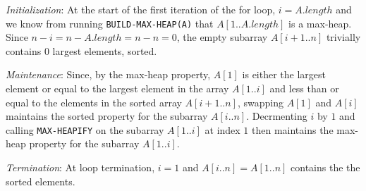 \textit{Initialization}: At the start of the first iteration of the for loop, $i = A.length$ and we know from running \texttt{BUILD-MAX-HEAP(A)} that $A[1..A.length]$ is a max-heap. Since $n-i = n - A.length = n - n = 0$, the empty subarray $A[i+1 .. n]$ trivially contains 0 largest elements, sorted.

\textit{Maintenance}: Since, by the max-heap property, $A[1]$ is either the largest element or equal to the largest element in the array $A[1..i]$ and less than or equal to the elements in the sorted array $A[i+1..n]$, swapping $A[1]$ and $A[i]$ maintains the sorted property for the subarray $A[i..n]$. Decrmenting $i$ by $1$ and calling \texttt{MAX-HEAPIFY} on the subarray $A[1..i]$ at index $1$ then maintains the max-heap property for the subarray $A[1..i]$.

\textit{Termination}: At loop termination, $i=1$ and $A[i..n] = A[1..n]$ contains the the sorted elements.
